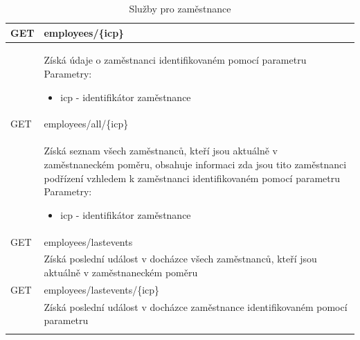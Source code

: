 \documentclass{diplomka}
\begin{document}
\begin{center}
\begin{longtable}[H]{| m{2cm} |  m{10cm} |}
\hline
\rowcolor{Gray}
GET  & employees/\{icp\} \\ \hline
&  \parbox{10cm}{\vspace{5 mm}Získá údaje o zaměstnanci identifikovaném pomocí parametru\\
Parametry:\begin{itemize}[noitemsep,nolistsep]
\item icp - identifikátor zaměstnance
\end{itemize}
\vspace{5 mm}} \\ \hline
{}
GET  & employees/all/\{icp\} \\ \hline
&  \parbox{10cm}{\vspace{5 mm}Získá seznam všech zaměstnanců, kteří jsou aktuálně v zaměstnaneckém poměru, obsahuje informaci zda jsou tito zaměstnanci podřízení vzhledem k zaměstnanci identifikovaném pomocí parametru\\
Parametry:\begin{itemize}[noitemsep,nolistsep]
\item icp - identifikátor zaměstnance
\end{itemize}
\vspace{5 mm}} \\ \hline
{}
GET  & employees/lastevents \\ 
&  \parbox{10cm}{\vspace{5 mm}Získá poslední událost v docházce všech zaměstnanců, kteří jsou aktuálně v zaměstnaneckém poměru
\vspace{5 mm}}\\
\hline
{}
GET  & employees/lastevents/\{icp\} \\ 
&  \parbox{10cm}{\vspace{5 mm}Získá poslední událost v docházce zaměstnance identifikovaném pomocí parametru
\vspace{5 mm}}\\
\hline
\caption{Služby pro zaměstnance}
\label{tab:uriemps}
\end{longtable}
\end{center}
\end{document}
